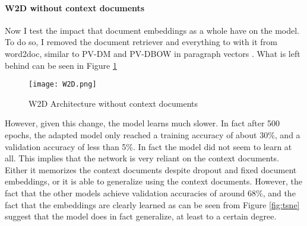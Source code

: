 \paragraph{W2D without context documents}
Now I test the impact that document embeddings as a whole have on the model. To do so, I removed the document retriever and
everything to with it from word2doc, similar to PV-DM and PV-DBOW in paragraph vectors \citep{doc2vec}. What is left behind
can be seen in Figure \ref{fig:w2d-raw}

\begin{figure}
  \begin{center}
    \texttt{[image: W2D.png]}
  \end{center}
  \caption{W2D Architecture without context documents}
  \label{fig:w2d-raw}
\end{figure}

However, given this change, the model learns much slower. In fact after 500 epochs, the adapted model only reached a training
accuracy of about 30\%, and a validation accuracy of less than 5\%. In fact the model did not seem to learn at all. This
implies that the network is very reliant on the context documents. Either it memorizes the context documents despite dropout and
fixed document embeddings, or it is able to generalize using the context documents. However, the fact that the other models achieve
validation accuracies of around 68\%, and the fact that the embeddings are clearly learned as can be seen from Figure \ref{fig:tsne}
suggest that the model does in fact generalize, at least to a certain degree.

